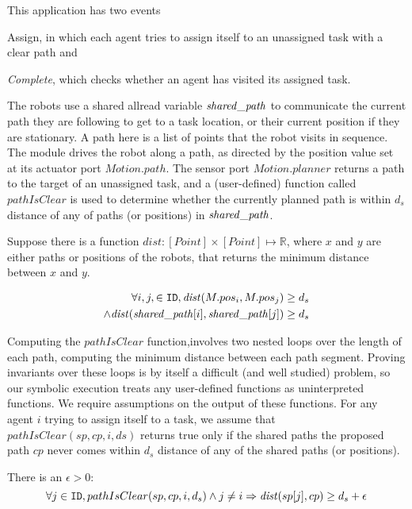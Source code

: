 This application has two events \begin{inparaenum} \item {Assign}, in which each agent tries to assign itself to an unassigned task with a clear path  and \item \emph{Complete}, which checks whether an agent has visited its assigned task. \end{inparaenum} The robots use a shared allread variable $\mathit{shared\_path}$ to communicate the current path they are following to get to a task location, or their current position if they are stationary. A path here is a list of points that the robot visits in sequence. The \Motion module drives the robot along a path, as directed by the position value set at its actuator port $\mathit{Motion.path}$. The sensor port $\mathit{Motion.planner}$ returns a path to the target of an unassigned task, and a (user-defined) function called $\mathit{pathIsClear}$ is used to determine whether the currently planned path is within $d_s$ distance of any of paths (or positions) in $\mathit{shared\_path}$.

\newcommand{\dist}{\mathit{dist}}
Suppose there is a function $\dist : [Point] \times [Point] \mapsto \mathbb{R}$, where $x$ and $y$ are either paths or positions of the robots, that returns the minimum distance between $x$ and $y$.
\begin{invariant}
\label{inv:task}
\[\begin{split}
    \forall i,j, \in \UINS, \dist(M.pos_i, M.pos_j) \geq d_s \\ \land \dist(\pathvar[i], \pathvar[j]) \geq d_s
\end{split}
\]
\end{invariant}
\noindent

Computing the $\mathit{pathIsClear}$ function,involves two nested loops over the length of each path, computing the minimum distance between each path segment. Proving invariants over these loops is by itself a difficult (and well studied) problem, so our symbolic execution treats any user-defined functions as uninterpreted functions. We require assumptions on the output of these functions. For any agent $i$ trying to assign itself to a task, we  assume that $\mathit{pathIsClear}(\mathit{sp}, \mathit{cp} ,i, \mathit{ds})$ returns true only if the shared paths the proposed path $\mathit{cp}$ never comes within $d_s$ distance of any of the shared paths (or positions).

\begin{assumption}
    \label{pathclear} There is an $\epsilon > 0$:
    $$\forall j \in \UINS, pathIsClear(sp, cp,  i, d_s) \wedge j \neq i \Rightarrow  \dist(sp[j], cp) \geq d_s + \epsilon$$
\end{assumption}

